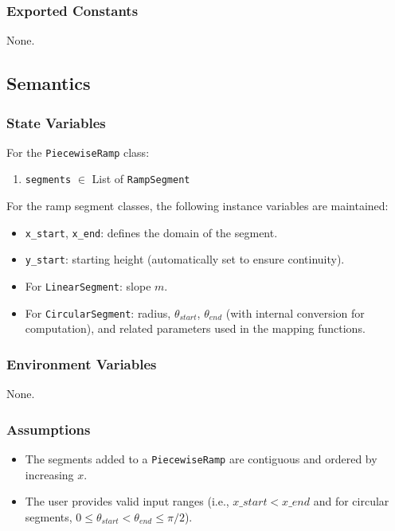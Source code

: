 \documentclass[12pt, titlepage]{article}
\begin{document}
\subsubsection{Exported Constants}
None.

\subsection{Semantics}

\subsubsection{State Variables}

For the \texttt{PiecewiseRamp} class:
\begin{enumerate}
  \item \texttt{segments} \(\in\) List of \texttt{RampSegment}
\end{enumerate}

For the ramp segment classes, the following instance variables are maintained:
\begin{itemize}
  \item \texttt{x\_start}, \texttt{x\_end}: defines the domain of the segment.
  \item \texttt{y\_start}: starting height (automatically set to ensure continuity).
  \item For \texttt{LinearSegment}: slope \(m\).
  \item For \texttt{CircularSegment}: radius, \(\theta_{start}\), \(\theta_{end}\) (with internal conversion for computation), and related parameters used in the mapping functions.
\end{itemize}

\subsubsection{Environment Variables}

None.

\subsubsection{Assumptions}

\begin{itemize}
  \item The segments added to a \texttt{PiecewiseRamp} are contiguous and ordered by increasing \(x\).
  \item The user provides valid input ranges (i.e., \(x\_start < x\_end\) and for circular segments, \(0 \le \theta_{start} < \theta_{end} \le \pi/2\)).
\end{itemize}
\end{document}
